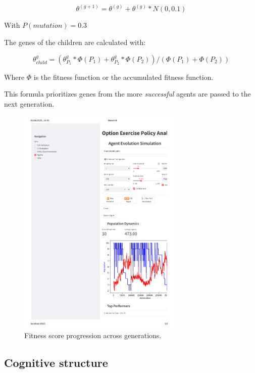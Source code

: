 \documentclass[12pt]{article}
\begin{document}
\begin{equation}
    \theta^{(g+1)} = \theta^{(g)} + \theta^{(g)} * N(0, 0.1)
\end{equation}

With $P(mutation) = 0.3$

The genes of the children are calculated with:

\begin{equation}
    \theta^{g}_{child} = (\theta^{g}_{P_1}*\Phi({P_1}) + \theta^{g}_{P_2}*\Phi({P_2})) / (\Phi({P_1}) + \Phi({P_2}))
\end{equation}

Where $\Phi$ is the fitness function or the accumulated fitness function.

This formula prioritizes genes from the more \emph{successful} agents are passed to the next generation.

\begin{figure}[H]
\centering
\includegraphics[width=0.7\textwidth]{fitness_evolution.pdf}
\caption{Fitness score progression across generations.}
\label{fig:fitness}
\end{figure}

\subsection{Cognitive structure}
\end{document}
